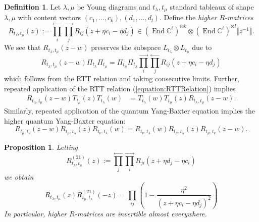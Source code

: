 \documentclass[11pt]{report}
\newtheorem{prop}[theorem]{Proposition}
\theoremstyle{definition}
\newtheorem{definition}[theorem]{Definition}
\theoremstyle{remark}
\theoremstyle{remark}
\newcommand{\End}{\operatorname{End}}
\newcommand{\C}{\mathbb{C}}
\begin{document}
\begin{definition}
Let $\lambda,\mu$ be Young diagrams and $t_\lambda,t_\mu$ standard tableaux of shape $\lambda,\mu$ with content vectors $(c_1,...,c_k),(d_1,...,d_l)$. Define the \emph{higher $R$-matrices}
\begin{equation}\label{equation:higherRMatrix}
R_{t_\lambda,t_\mu}(z) := \overset{\longleftarrow}{\prod_i} \overset{\longrightarrow}{\prod_j} R_{ij}(z+\eta c_i - \eta d_j) \in (\End \C^\ell)^{\otimes k} \otimes (\End \C^\ell)^{\otimes l}\llbracket z^{-1} \rrbracket.
\end{equation}
We see that $R_{t_\lambda,t_\mu}(z-w)$ preserves the subspace $L_{t_\lambda} \otimes L_{t_\mu}$ due to
\begin{equation*}
R_{t_\lambda,t_\mu}(z-w) \Pi_{t_\lambda} \Pi_{t_\mu} = \Pi_{t_\mu} \Pi_{t_\lambda} \overset{\longrightarrow}{\prod_i} \overset{\longleftarrow}{\prod_j} R_{ij}(z+\eta c_i - \eta d_j)
\end{equation*}
which follows from the RTT relation and taking consecutive limits.
Further, repeated application of the RTT relation (\ref{equation:RTTRelation}) implies
\begin{align*}
R_{t_\lambda,t_\mu}(z-w) T_{t_\mu}(z) T_{t_\lambda}(w) &= T_{t_\lambda}(w) T_{t_\mu}(z) R_{t_\lambda,t_\mu}(z-w).
\end{align*}
Similarly, repeated application of the quantum Yang-Baxter equation implies the higher quantum Yang-Baxter equation:
\begin{equation*}
R_{t_\mu,t_\nu}(z-w) R_{t_\mu,t_\lambda}(z) R_{t_\nu,t_\lambda}(w) =  R_{t_\nu,t_\lambda}(w) R_{t_\mu,t_\lambda}(z) R_{t_\mu,t_\nu}(z-w).
\end{equation*}
\end{definition}

\begin{prop}
Letting
\begin{equation*}
R_{t_\lambda,t_\mu}^{(21)}(z) := \overset{\longleftarrow}{\prod_j} \overset{\longrightarrow}{\prod_i} R_{ji}(z+\eta d_j - \eta c_i)
\end{equation*}
we obtain
\begin{equation*}
R_{t_\lambda,t_\mu}(z) R_{t_\mu,t_\lambda}^{(21)}(-z) = \prod_{ij} \left( 1 - \frac{\eta^2}{(z+\eta c_i-\eta d_j)^2}\right)
\end{equation*}
In particular, higher $R$-matrices are invertible almost everywhere.
\end{prop}
\end{document}
